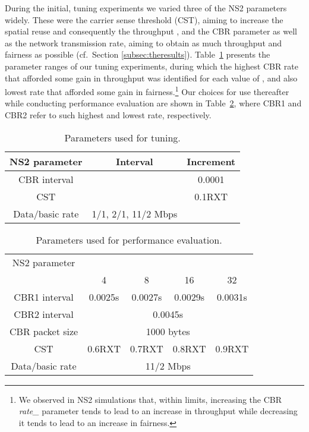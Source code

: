 \documentclass{article}
\begin{document}
During the initial, tuning experiments we varied three of the NS2 parameters
widely. These were the carrier sense threshold (CST), aiming to increase the
spatial reuse and consequently the throughput \cite{Kim2006}, and the CBR
parameter as well as the network transmission rate, aiming to obtain as much
throughput and fairness as possible (cf.\ Section \ref{subsec:theresults}).
Table~\ref{table1} presents the parameter ranges of our tuning experiments,
during which the highest CBR rate that afforded some gain in throughput was
identified for each value of , and also lowest rate that afforded some
gain in fairness.\footnote{We observed in NS2 simulations that, within limits,
increasing the CBR \emph{rate\_} parameter tends to lead to an increase in
throughput while decreasing it tends to lead to an increase in fairness.} Our
choices for use thereafter while conducting performance evaluation are shown in
Table~\ref{table2}, where CBR1 and CBR2 refer to such highest and lowest rate,
respectively.

\begin{table}[t]
\centering
\caption{Parameters used for tuning.}
\begin{tabular}{ccc}
\hline
NS2 parameter  & Interval                                    & Increment \\ \hline
CBR interval   &   & 0.0001    \\
CST            &     & 0.1RXT    \\
Data/basic rate& 1/1, 2/1, 11/2 Mbps                         &           \\
\end{tabular}
 \label{table1}
\end{table}

\begin{table}[t]
\centering
\caption{Parameters used for performance evaluation.}
\begin{tabular}{ccccc}
\hline
NS2 parameter   & \multicolumn{4}{c}{}           \\ \cline{2-5}
                & 4       & 8       & 16      & 32       \\ \hline 
CBR1 interval   & 0.0025s & 0.0027s & 0.0029s & 0.0031s  \\  
CBR2 interval   & \multicolumn{4}{c}{0.0045s}             \\
CBR packet size & \multicolumn{4}{c}{1000 bytes}         \\
CST             & 0.6RXT  & 0.7RXT  & 0.8RXT  & 0.9RXT   \\
Data/basic rate & \multicolumn{4}{c}{11/2 Mbps}          \\
\end{tabular}
 \label{table2}
\end{table}
\end{document}
